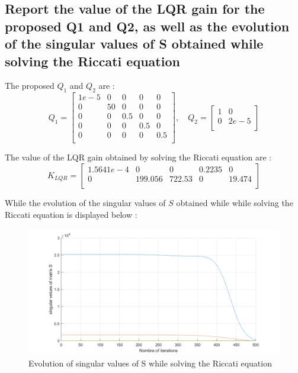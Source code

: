 \subsection{ Report the value of the LQR gain for the proposed Q1 and Q2, as well as the evolution of the singular values of S obtained while solving the Riccati equation}
The proposed $Q_1$ and $Q_2$ are :
\begin{equation}
    Q_1 = 
    \left[ {\begin{array}{ccccc}
        1e-5 &0  &0   &0   &0     \\
        0    &50 &0   &0   &0     \\
        0    &0  &0.5 &0   &0     \\
        0    &0  &0   &0.5 &0     \\
        0    &0  &0   &0   &0.5   \\
    \end{array} } \right]    
    ,\quad
    Q_2 =
    \left[ {\begin{array}{cc}
        1 &0\\
        0 &2e-5\\
    \end{array} } \right]
\end{equation}

The value of the LQR gain obtained by solving the Riccati equation are :
\begin{equation}
    K_{LQR} = 
    \left[ {\begin{array}{ccccc}
         1.5641e-4 &0       &0      &0.2235 &0      \\
         0         &199.056 &722.53 &0      &19.474 \\
    \end{array}}\right]
\end{equation}

While the evolution of the singular values of $S$ obtained while while solving the Riccati equation is displayed below :
\begin{figure}[H]
    \centering
    \includegraphics[width = 0.7\linewidth]{Latex report/image/ex2/svds.png}
    \caption{Evolution of singular values of S while solving the Riccati equation}
    \label{fig:svds}
\end{figure}




